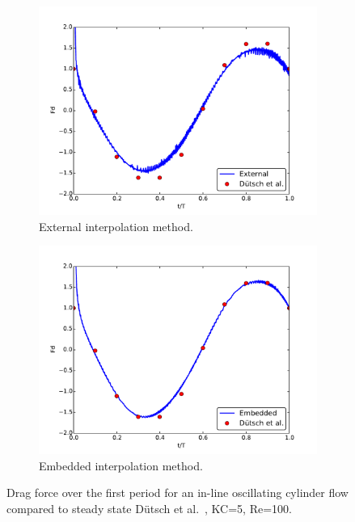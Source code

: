 \documentclass[preprint,12pt,5p]{elsarticle}
\begin{document}
\begin{figure}[!htb]
	\centering
	\begin{subfigure}{0.5\textwidth}
		\includegraphics[width=\linewidth]{staticexinit}
		\caption{External interpolation method.}
	\end{subfigure}
	
	\begin{subfigure}{0.5\textwidth}
		\includegraphics[width=\linewidth]{staticeminit}
		\caption{Embedded interpolation method.}
	\end{subfigure}
	\caption{Drag force over the first period for an in-line oscillating cylinder flow compared to steady state D\"{u}tsch et al.~\cite{dutsch1998low}, KC=5, Re=100.}
	\label{fig:staticInit}
\end{figure}
\end{document}
